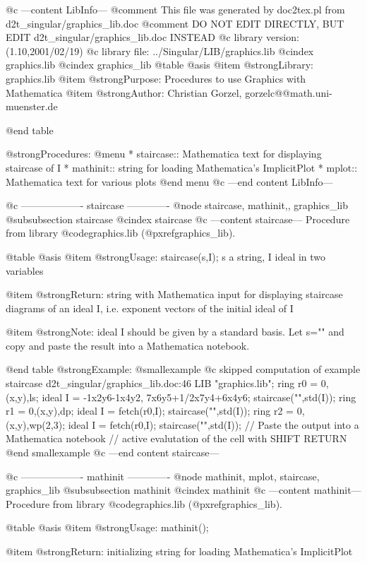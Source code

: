 @c ---content LibInfo---
@comment This file was generated by doc2tex.pl from d2t_singular/graphics_lib.doc
@comment DO NOT EDIT DIRECTLY, BUT EDIT d2t_singular/graphics_lib.doc INSTEAD
@c library version: (1.10,2001/02/19)
@c library file: ../Singular/LIB/graphics.lib
@cindex graphics.lib
@cindex graphics_lib
@table @asis
@item @strong{Library:}
graphics.lib
@item @strong{Purpose:}
    Procedures to use Graphics with Mathematica
@item @strong{Author:}
Christian Gorzel, gorzelc@@math.uni-muenster.de

@end table

@strong{Procedures:}
@menu
* staircase:: Mathematica text for displaying staircase of I
* mathinit:: string for loading Mathematica's ImplicitPlot
* mplot:: Mathematica text for various plots
@end menu
@c ---end content LibInfo---

@c ------------------- staircase -------------
@node staircase, mathinit,, graphics_lib
@subsubsection staircase
@cindex staircase
@c ---content staircase---
Procedure from library @code{graphics.lib} (@pxref{graphics_lib}).

@table @asis
@item @strong{Usage:}
staircase(s,I); s a string, I ideal in two variables

@item @strong{Return:}
string with Mathematica input for displaying staircase diagrams of an
ideal I, i.e. exponent vectors of the initial ideal of I

@item @strong{Note:}
ideal I should be given by a standard basis. Let s="" and copy and
paste the result into a Mathematica notebook.

@end table
@strong{Example:}
@smallexample
@c skipped computation of example staircase d2t_singular/graphics_lib.doc:46 
LIB "graphics.lib";
ring r0 = 0,(x,y),ls;
ideal I = -1x2y6-1x4y2, 7x6y5+1/2x7y4+6x4y6;
staircase("",std(I));
ring r1 = 0,(x,y),dp;
ideal I = fetch(r0,I);
staircase("",std(I));
ring r2 = 0,(x,y),wp(2,3);
ideal I = fetch(r0,I);
staircase("",std(I));
// Paste the output into a Mathematica notebook
// active evalutation of the cell with SHIFT RETURN
@end smallexample
@c ---end content staircase---

@c ------------------- mathinit -------------
@node mathinit, mplot, staircase, graphics_lib
@subsubsection mathinit
@cindex mathinit
@c ---content mathinit---
Procedure from library @code{graphics.lib} (@pxref{graphics_lib}).

@table @asis
@item @strong{Usage:}
mathinit();

@item @strong{Return:}
initializing string for loading Mathematica's ImplicitPlot

